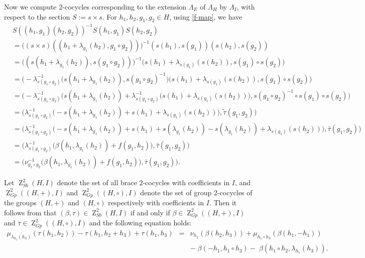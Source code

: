 \documentclass[11pt]{amsart}
\theoremstyle{thrm}
\theoremstyle{plain}
\theoremstyle{definition}
\newcommand{\Z}{\operatorname{Z} }
\numberwithin{equation}{section}
\begin{document}
Now we compute  $2$-cocycles corresponding to the extension $\Lambda_E$ of $\Lambda_H$ by $\Lambda_I$, with respect to the section $S:=s \times s$. For  $h_1, h_2, g_1, g_2 \in H$, using \eqref{f-map}, we have
\begin{align*}
 &S((h_1,g_1) (h_2, g_2))^{-1} S(h_1, g_1) S(h_2, g_2)\\
&= \big((s \times s)((h_1+ \lambda_{g_1}(h_2), g_1 \circ g_2)) \big)^{-1}(s(h_1), s(g_1) ) (s(h_2), s(g_2))\\
&= \big((s(h_1+ \lambda_{g_1}(h_2)), s(g_1 \circ g_2)) \big)^{-1} \big( s(h_1)+ \lambda_{s(g_1)}(s(h_2)), s(g_1) \circ s(g_2) \big)\\
&= \big( -\lambda^{-1}_{s(g_1 \circ g_2)}(s(h_1+ \lambda_{g_1}(h_2)), s(g_1 \circ g_2)^{-1} \big) \big( s(h_1)+ \lambda_{s(g_1)}(s(h_2)), s(g_1) \circ s(g_2) \big)\\
&=  \big( -\lambda^{-1}_{s(g_1 \circ g_2)}(s(h_1+ \lambda_{g_1}(h_2)) + \lambda^{-1}_{ s(g_1 \circ g_2)}\big(s(h_1)+ \lambda_{s(g_1)}(s(h_2))\big),  s(g_1 \circ g_2)^{-1} \circ s(g_1) \circ s(g_2) \big)\\
&=  \big( \lambda^{-1}_{s(g_1 \circ g_2)}\big(-s(h_1+ \lambda_{g_1}(h_2))+ s(h_1)+ \lambda_{s(g_1)}(s(h_2)) \big), \tilde{\tau}(g_1, g_2)\big)\\
&=   \big( \lambda^{-1}_{s(g_1 \circ g_2)}\big(-s(h_1+ \lambda_{g_1}(h_2))+ s(h_1)+ s(\lambda_{g_1}(h_2))-s(\lambda_{g_1}(h_2))+  \lambda_{s(g_1)}(s(h_2))\big), \bar{\tau}(g_1, g_2)\big)\\
&=  \big( \lambda^{-1}_{s(g_1 \circ g_2)}\big(\beta(h_1, \lambda_{g_1}(h_2))+ f(g_1, h_2)\big),  \bar{\tau}(g_1, g_2)\big)\\
&= \big(\nu^{-1}_{g_1 \circ g_2} \big(\beta(h_1, \lambda_{g_1}(h_2))+ f(g_1, h_2)\big), \bar{\tau}(g_1, g_2) \big).
\end{align*}

Let $\Z^2_{Sb}(H,I)$ denote the set of all brace $2$-cocycles with coefficients in $I$, and $\Z^2_{Gp}((H, +),I)$  and  $\Z^2_{Gp}((H, \circ),I)$ denote the set of group $2$-cocycles of the groups $(H, +)$ and $(H, \circ)$ respectively with coefficients in $I$. Then it follows from \cite[Page 10, Eqn. (13)]{RY24} that $(\beta, \tau) \in \Z^2_{Sb}(H,I)$ if and only if  $\beta \in \Z^2_{Gp}((H, +),I)$ and $\overline{\tau} \in \Z^2_{Gp}((H, \circ),I)$ and  the following equation holds:
\begin{eqnarray}\label{mutual1}
	\mu_{\lambda_{h_1}(h_3)}(\tau(h_1, h_2)) - \tau(h_1, h_2 + h_3) +\tau(h_1, h_3) &=& \nu_{h_1}(\beta(h_2, h_3)) + \mu_{h_1 \circ h_3}(\beta(h_1, - h_1)) \nonumber \\ 
	& & - \; \beta(-h_1, h_1 \circ h_3)   - \; \beta(h_1 \circ h_2, \lambda_{h_1}(h_3)).
\end{eqnarray}
\end{document}
